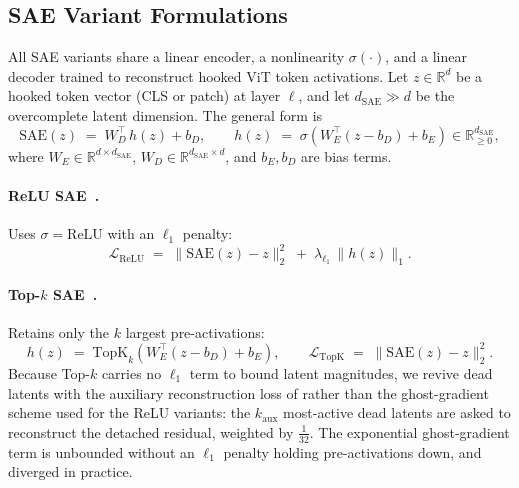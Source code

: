 \newcommand{\maketitlesupplementary}{}
\setcounter{page}{1}
\maketitlesupplementary
\subsection{SAE Variant Formulations}
\label{app:sae-variants}
 
All SAE variants share a linear encoder, a nonlinearity $\sigma(\cdot)$, and a linear decoder trained to reconstruct hooked ViT token activations. Let $z \in \mathbb{R}^d$ be a hooked token vector (CLS or patch) at layer $\ell$, and let $d_{\mathrm{SAE}} \gg d$ be the overcomplete latent dimension. The general form is
\begin{equation}
\mathrm{SAE}(z) \;=\; W_D^{\top}\,h(z) + b_D,
\qquad
h(z) \;=\; \sigma\!\left(W_E^{\top}(z - b_D) + b_E\right)
\in \mathbb{R}^{d_{\mathrm{SAE}}}_{\geq 0},
\label{eq:sae-general}
\end{equation}
where $W_E \in \mathbb{R}^{d \times d_{\mathrm{SAE}}}$, $W_D \in \mathbb{R}^{d_{\mathrm{SAE}} \times d}$, and $b_E, b_D$ are bias terms.
 
\paragraph{ReLU SAE~\citep{cunningham2024sparse}.}
Uses $\sigma = \mathrm{ReLU}$ with an $\ell_1$ penalty:
\begin{equation}
\mathcal{L}_{\mathrm{ReLU}}
\;=\;
\|\mathrm{SAE}(z) - z\|_2^2
\;+\;
\lambda_{\ell_1}\,\|h(z)\|_1.
\label{eq:relu-sae}
\end{equation}
 
\paragraph{Top-$k$ SAE~\citep{gao2025scaling}.}
Retains only the $k$ largest pre-activations:
\begin{equation}
h(z) \;=\; \mathrm{TopK}_{k}\!\left(W_E^{\top}(z - b_D) + b_E\right),
\qquad
\mathcal{L}_{\mathrm{TopK}} \;=\; \|\mathrm{SAE}(z) - z\|_2^2.
\label{eq:topk-sae}
\end{equation}
Because Top-$k$ carries no $\ell_1$ term to bound latent magnitudes, we revive dead
latents with the auxiliary reconstruction loss of \citet{gao2025scaling} rather than
the ghost-gradient scheme used for the ReLU variants: the $k_{\mathrm{aux}}$ most-active
dead latents are asked to reconstruct the detached residual, weighted by
$\tfrac{1}{32}$. The exponential ghost-gradient term is unbounded without an $\ell_1$
penalty holding pre-activations down, and diverged in practice.

